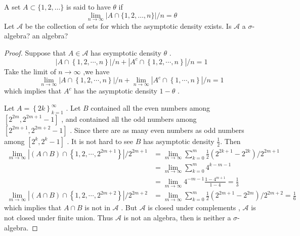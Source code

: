 \documentclass[../main.tex]{subfiles}
\begin{document}
\begin{exercise}{}{}
A set $A \subset \{1, 2, \dots\}$ is said to have  $\theta$ if
\[
\lim_{n\to\infty} |A \cap \{1, 2, \dots, n\}|/n = \theta
\]
Let $\mathcal{A}$ be the collection of sets for which the asymptotic density exists. Is $\mathcal{A}$ a $\sigma$-algebra? an algebra?
\end{exercise}
\begin{proof}
    Suppose that \(  A\in \mathcal{A}  \) has esymptotic density \(   \theta   \) .  \[
    \left| A\cap \left\{ 1,2,\cdots ,n \right\} \right|/n+ \left| A^{c}\cap \left\{ 1,2,\cdots ,n \right\} \right|/n= 1  
    \]  Take the limit of \(  n\to \infty  \) ,we have \[
    \lim_{n\to \infty} \left| A\cap \left\{ 1,2,\cdots ,n \right\} \right|/n + \lim_{n\to \infty} \left| A^{c}\cap \left\{  1,\cdots,n  \right\} \right|/n = 1  
    \] which implies that \(  A^{c}  \) has the asymptotic density \(  1- \theta   \) .  
    
    Let \(  A = \left\{ 2k \right\} _{k= 1}^{\infty} \) .  Let \(  B   \) contained all the even numbers among \(  \left[ 2^{2m}, 2^{2m+ 1}-1 \right]   \)  , and contained all the odd numbers among \(  \left[ 2^{2m+ 1}, 2^{2m+ 2}-1 \right]   \)   . Since there are as many even numbers as odd numbers among \(  \left[ 2^{k},2^{k}-1 \right]   \) . It is not hard to see \(  B  \) has asymptotic density \(  \frac{1}{2}  \).  Then \[
   \begin{aligned}
    \lim_{m\to \infty} \left| \left( A\cap B \right) \cap \left\{ 1,2,\cdots ,2^{2m+ 1} \right\}  \right|/2^{2m+ 1}&=\lim_{m\to \infty}\sum _{k = 0}^{m} \frac{1 }{2 }\left( 2^{2k+ 1}-2^{2k} \right)/2^{2m+ 1}\\ 
     &= \lim_{m\to \infty} \sum _{k = 0}^{m} 4^{k-m-1}\\ 
      &= \lim_{m\to \infty} 4^{-m-1} \frac{1-4^{m+ 1} }{ 1-4}= \frac{1 }{3 }  
   \end{aligned}
    \]   \[
    \begin{aligned}
    \lim_{m\to \infty} \left| \left( A\cap B \right) \cap \left\{ 1,2,\cdots ,2^{2m+ 2} \right\} \right|/ 2^{2m+ 2} &=  \lim_{m\to \infty}  \sum _{k = 0}^{m} \frac{1}{2}\left( 2^{2m+ 1}-2^{2m} \right)/2^{2m+ 2} = \frac{1}{6}
    \end{aligned}
    \] which implies that  \(  A\cap B  \) is not in \(  \mathcal{A}  \) . But \(  \mathcal{A}  \) is closed under complements ,  \(  \mathcal{A}  \) is not closed under finite union. Thus \(  \mathcal{A}  \) is not an algebra, then is neither a \(   \sigma   \)- algebra.         
\end{proof}
\end{document}
